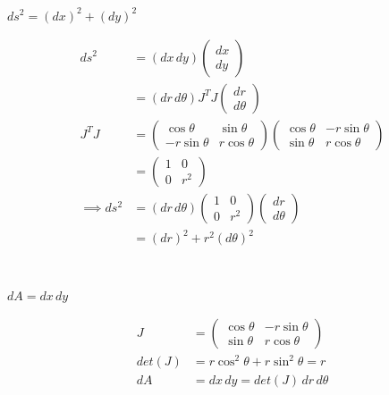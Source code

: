 \documentclass[twoside]{scrartcl}
\begin{document}
\pagebreak
\begin{example}
$ds^2 = (dx)^2	+ (dy)^2$

\[
\begin{aligned}
  ds^2 &= (dx\, dy)\begin{pmatrix}
dx \\ dy	
\end{pmatrix}\\
&= (dr\, d\theta) J^TJ \begin{pmatrix}
 dr \\ d\theta	
 \end{pmatrix}\\[0.2cm]
 J^TJ &= \begin{pmatrix}
 \cos\theta & \sin\theta \\
 -r\sin\theta & r\cos\theta 	
 \end{pmatrix}
\begin{pmatrix}
\cos\theta & -r\sin\theta\\
\sin\theta & r\cos\theta 	
\end{pmatrix}\\
&= \begin{pmatrix}
 1 & 0\\
 0 & r^2	
 \end{pmatrix}\\[0.2cm]
\implies  ds^2 &= (dr \, d\theta)
\begin{pmatrix}
1 & 0 \\ 0 & r^2	
\end{pmatrix}
\begin{pmatrix}
dr \\ d\theta 	
\end{pmatrix}\\
&= (dr)^2 + r^2(d\theta)^2
\end{aligned}
\]

\end{example}~

\begin{example}
$dA = dx\,dy$

\[
\begin{aligned}
  J &= \begin{pmatrix}
 \cos\theta & -r\sin\theta\\
 \sin\theta & r\cos\theta 	
 \end{pmatrix}\\
 det(J) &= r\cos^2\theta + r\sin^2\theta = r\\
 dA &= dx\,dy = det(J)\,dr\,d\theta 
\end{aligned}
\]

\end{example}
\end{document}
